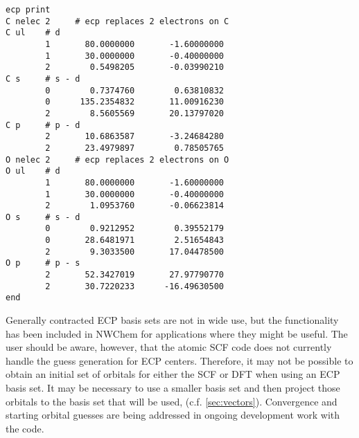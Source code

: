 
\begin{verbatim}
ecp print  
C nelec 2     # ecp replaces 2 electrons on C
C ul    # d
        1       80.0000000       -1.60000000
        1       30.0000000       -0.40000000
        2        0.5498205       -0.03990210
C s     # s - d 
        0        0.7374760        0.63810832
        0      135.2354832       11.00916230
        2        8.5605569       20.13797020
C p     # p - d
        2       10.6863587       -3.24684280
        2       23.4979897        0.78505765
O nelec 2     # ecp replaces 2 electrons on O
O ul    # d 
        1       80.0000000       -1.60000000
        1       30.0000000       -0.40000000
        2        1.0953760       -0.06623814
O s     # s - d
        0        0.9212952        0.39552179
        0       28.6481971        2.51654843
        2        9.3033500       17.04478500
O p     # p - s 
        2       52.3427019       27.97790770
        2       30.7220233      -16.49630500
end
\end{verbatim}

Generally contracted ECP basis sets are not in wide use, but the
functionality has been included in NWChem for applications where
they might be useful.  The user should be aware, however, that
the atomic SCF code does not currently handle the guess
generation for ECP centers.  Therefore, it may not be possible to obtain
an initial set of orbitals for either the SCF or DFT when using an ECP
basis set.  It may be necessary to use a smaller basis set and then
project those orbitals to the
basis set that will be used, (c.f. \ref{sec:vectors}).  Convergence
and starting orbital guesses are being addressed in ongoing development
work with the code.
